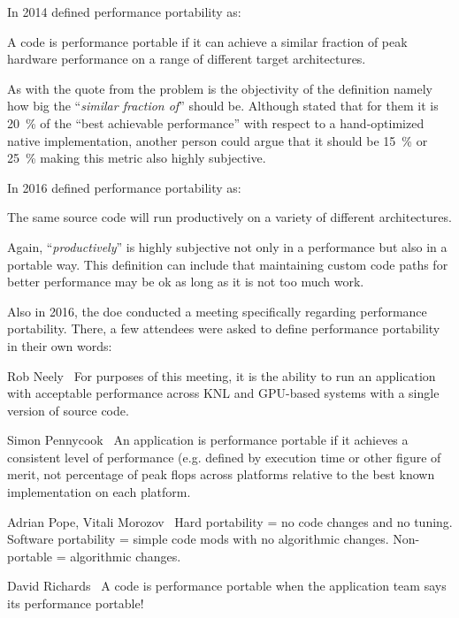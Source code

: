 In 2014 \citeauthor{kunkel_performance_2014} defined performance portability as:
\begin{quotebox}{\citet{kunkel_performance_2014}}
    A code is performance portable if it can achieve a similar fraction of peak hardware performance on a range of different target architectures.
\end{quotebox}
As with the quote from \citeauthor{edwards_kokkos_2013} the problem is the objectivity of the definition namely how big the \enquote{\textit{similar fraction of}} should be. 
Although \citeauthor{kunkel_performance_2014} stated that for them it is \SI{20}{\percent} of the \enquote{best achievable performance} with respect to a hand-optimized native implementation, another person could argue that it should be \SI{15}{\percent} or \SI{25}{\percent} making this metric also highly subjective. 

In 2016 \citet{larkin_performance_2016} defined performance portability as:
\begin{quotebox}{\citet{larkin_performance_2016}}
    The same source code will run productively on a variety of different architectures.
\end{quotebox}
Again, \enquote{\textit{productively}} is highly subjective not only in a performance but also in a portable way. 
This definition can include that maintaining custom code paths for better performance may be ok as long as it is not too much work. 

Also in 2016, the \gls{doe} conducted a meeting \cite{neely_doe_2016} specifically regarding performance portability. 
There, a few attendees were asked to define performance portability in their own words:
\begin{quotebox}{Rob Neely~\cite{neely_doe_2016}}
    For purposes of this meeting, it is the ability to run an application with acceptable performance across KNL and GPU-based systems with a single version of source code.
\end{quotebox}
\begin{quotebox}{Simon Pennycook~\cite{neely_doe_2016}}
    An application is performance portable if it achieves a consistent level of performance (e.g. defined by execution time or other figure of merit, not percentage of peak flops across platforms relative to the best known implementation on each platform.
\end{quotebox}
\begin{quotebox}{Adrian Pope, Vitali Morozov~\cite{neely_doe_2016}}
    Hard portability = no code changes and no tuning. Software portability = simple code mods with no algorithmic changes. Non-portable = algorithmic changes.
\end{quotebox}
\begin{quotebox}{David Richards~\cite{neely_doe_2016}}
    A code is performance portable when the application team says its performance portable!
\end{quotebox}


